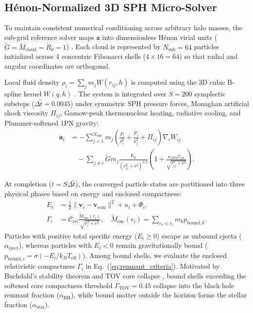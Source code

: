 \documentclass[10pt,twocolumn,letterpaper]{article}
\begin{document}
\subsection{H\'{e}non-Normalized 3D SPH Micro-Solver}
To maintain consistent numerical conditioning across arbitrary halo masses, the sub-grid reference solver maps $\mathbf{z}$ into dimensionless H\'{e}non virial units ($\tilde{G} = \tilde{M}_{\text{cloud}} = \tilde{R}_0 = 1$) \cite{henon1971}. Each cloud is represented by $N_{\text{sub}} = 64$ particles initialized across 4 concentric Fibonacci shells ($4 \times 16 = 64$) so that radial and angular coordinates are orthogonal.

Local fluid density $\rho_i = \sum_j m_j W(r_{ij}, h)$ is computed using the 3D cubic B-spline kernel $W(q, h)$ \cite{monaghan1992}. The system is integrated over $S = 200$ symplectic substeps ($\Delta\tilde{t} = 0.0045$) under symmetric SPH pressure forces, Monaghan artificial shock viscosity $\Pi_{ij}$, Gamow-peak thermonuclear heating, radiative cooling, and Plummer-softened 1PN gravity:
\begin{equation}
\begin{aligned}
    \mathbf{a}_i &= -\sum_{j=1}^{N_{\text{sub}}} m_j \left(\frac{P_i}{\rho_i^2} + \frac{P_j}{\rho_j^2} + \Pi_{ij}\right)\nabla_i W_{ij} \\
    &\quad - \sum_{j \neq i} \tilde{G}m_j \frac{\mathbf{r}_{ij}}{(r_{ij}^2 + \epsilon^2)^{3/2}}\left(1 + \frac{\kappa_{\text{1PN}}\mathcal{C}_{\text{rel}}}{\sqrt{r_{ij}^2 + \epsilon^2}}\right).
\end{aligned}
\label{eq:sph_force}
\end{equation}

At completion ($t = S\Delta\tilde{t}$), the converged particle states are partitioned into three physical phases based on energy and enclosed compactness:
\begin{equation}
\begin{aligned}
    E_i &= \frac{1}{2}\|\mathbf{v}_i - \mathbf{v}_{\text{com}}\|^2 + u_i + \Phi_i, \\
    \Gamma_i &= \mathcal{C}_{\text{rel}} \frac{\tilde{M}_{\text{enc}}(r_i)}{\sqrt{r_i^2 + \epsilon^2}}, \quad \tilde{M}_{\text{enc}}(r_i) = \sum_{r_k \le r_i} m_k p_{\text{bound},k}.
\end{aligned}
\label{eq:remnant_criteria}
\end{equation}
Particles with positive total specific energy ($E_i \ge 0$) escape as unbound ejecta ($\alpha_{\text{eject}}$), whereas particles with $E_i < 0$ remain gravitationally bound ($p_{\text{bound},i} = \sigma(-E_i / k_B T_{\text{eff}})$). Among bound shells, we evaluate the enclosed relativistic compactness $\Gamma_i$ in Eq.\ (\ref{eq:remnant_criteria}). Motivated by Buchdahl's stability theorem \cite{buchdahl1959} and TOV core collapse \cite{shapiro1983}, bound shells exceeding the softened core compactness threshold $\Gamma_{\text{TOV}} = 0.45$ collapse into the black hole remnant fraction ($\alpha_{\text{BH}}$), while bound matter outside the horizon forms the stellar fraction ($\alpha_{\text{star}}$).
\end{document}
